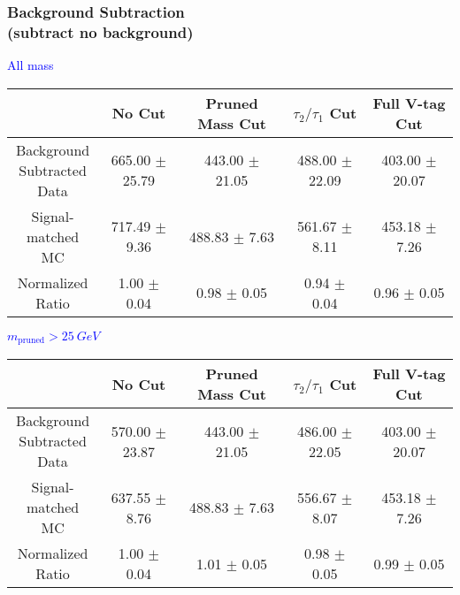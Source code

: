 \documentclass{beamer}
\begin{document}
\begin{frame}
  \frametitle{Background Subtraction \\ (subtract no background)}
  \begin{adjustwidth}{-1.5em}{-1.5em}
    \centering
    \vspace{6pt}
    \textcolor{blue}{All mass}
    \vspace{6pt}

    {\scriptsize
      \begin{tabular}{c | c | c | c | c}
        \hline
        & No Cut & Pruned Mass Cut & $\tau_2/\tau_1$ Cut & Full V-tag Cut \\
        \hline
        \makecell{Background \\ Subtracted \\ Data} & 665.00 $\pm$ 25.79 & 443.00 $\pm$ 21.05 & 488.00 $\pm$ 22.09 & 403.00 $\pm$ 20.07 \\
        \makecell{Signal-\\ matched MC} & 717.49 $\pm$ 9.36 & 488.83 $\pm$ 7.63 & 561.67 $\pm$ 8.11 & 453.18 $\pm$ 7.26 \\
        \hline
        \makecell{Normalized \\ Ratio} & 1.00 $\pm$ 0.04 & 0.98 $\pm$ 0.05 & 0.94 $\pm$ 0.04 & 0.96 $\pm$ 0.05 \\
        \hline
      \end{tabular}
    }

    \vspace{6pt}
    \textcolor{blue}{$m_\text{pruned} > \SI{25}{GeV}$}
    \vspace{6pt}

    {\scriptsize
      \begin{tabular}{c | c | c | c | c}
        \hline
        & No Cut & Pruned Mass Cut & $\tau_2/\tau_1$ Cut & Full V-tag Cut \\
        \hline
        \makecell{Background \\ Subtracted \\ Data} & 570.00 $\pm$ 23.87 & 443.00 $\pm$ 21.05 & 486.00 $\pm$ 22.05 & 403.00 $\pm$ 20.07 \\
        \makecell{Signal-\\ matched MC} & 637.55 $\pm$ 8.76 & 488.83 $\pm$ 7.63 & 556.67 $\pm$ 8.07 & 453.18 $\pm$ 7.26 \\
        \hline
        \makecell{Normalized \\ Ratio} & 1.00 $\pm$ 0.04 & 1.01 $\pm$ 0.05 & 0.98 $\pm$ 0.05 & 0.99 $\pm$ 0.05 \\
        \hline
      \end{tabular}
    }
  \end{adjustwidth}
\end{frame}
\end{document}

